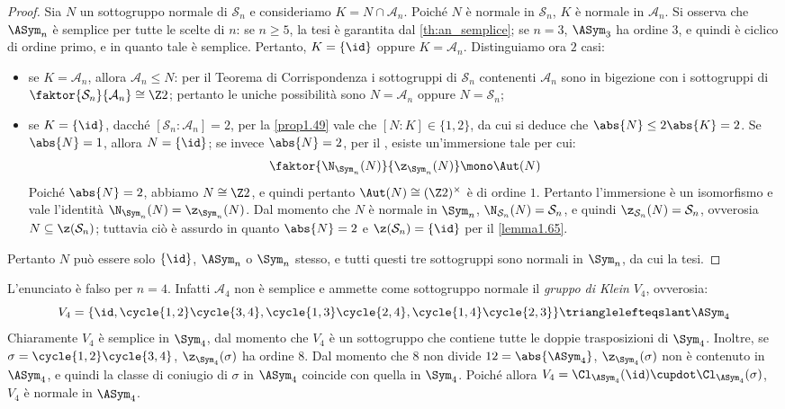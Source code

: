 \documentclass[11pt]{scrartcl}
\begin{document}
	\begin{proof}
		Sia $N$ un sottogruppo normale di $\mathcal{S}_n$ e consideriamo $K = N \cap \mathcal{A}_n$. Poiché $N$ è normale in $\mathcal{S}_n$, $K$ è normale
		in $\mathcal{A}_n$. Si osserva che $\ASym_n$ è semplice per tutte le scelte
		di $n$: se $n \geq 5$, la tesi è garantita dal \autoref{th:an_semplice}; se
		$n = 3$, $\ASym_3$ ha ordine
		$3$, e quindi è ciclico di ordine primo, e in quanto tale è semplice.
		Pertanto, $K = \{\id\}$ oppure $K = \mathcal{A}_n$. Distinguiamo ora $2$ casi:
		\begin{itemize}
			\item se $K = \mathcal{A}_n$, allora $\mathcal{A}_n \leqslant N$: per il
			Teorema di Corrispondenza i sottogruppi di $\mathcal{S}_n$ contenenti $\mathcal{A}_n$
			sono in bigezione con i sottogruppi di $\faktor{\mathcal{S}_n}{\mathcal{A}_n}\cong \Z2$;
			pertanto le uniche possibilità sono $N = \mathcal{A}_n$ oppure $N = \mathcal{S}_n$;
			\item se $K = \{\id\}$, dacché $[\mathcal{S}_n:\mathcal{A}_n] = 2$, per la 
			\autoref{prop1.49} vale che $[N : K] \in \{1, 2\}$, 
			da cui si deduce che $\abs{N} \leq 2 \abs{K} = 2$. Se $\abs{N} = 1$, allora $N = \{\id\}$; se invece $\abs{N} = 2$, per il , esiste
			un'immersione tale per cui:
			\[ \faktor{\N_{\Sym_n}(N)}{\z_{\Sym_n}(N)} \mono \Aut(N) \]
			Poiché $\abs{N} = 2$, abbiamo $N \cong \Z2$, e quindi pertanto $\Aut(N) \cong (\Z2)^\times$ è di ordine $1$. Pertanto l'immersione è un isomorfismo e
			vale l'identità
			$\N_{\Sym_n}(N) = \z_{\Sym_n}(N)$.
			Dal momento che $N$ è normale in $\Sym_n$, $\N_{\mathcal{S}_n}(N) = \mathcal{S}_n$,
			e quindi $\z_{\mathcal{S}_n}(N) = \mathcal{S}_n$, ovverosia $N \subseteq \z(\mathcal{S}_n)$; tuttavia ciò è assurdo
			in quanto $\abs{N} = 2$ e $\z(\mathcal{S}_n) = \{\id\}$ per il \autoref{lemma1.65}.
		\end{itemize}
		Pertanto $N$ può essere solo $\{\id\}$, $\ASym_n$ o $\Sym_n$ stesso, e tutti
		questi tre sottogruppi sono normali in $\Sym_n$, da cui la tesi.
	\end{proof}
	
	\begin{remark}
		L'enunciato è falso per $n = 4$.
		Infatti $\mathcal{A}_4$ non è semplice e ammette come sottogruppo normale il \textit{gruppo di Klein} $V_4$, ovverosia:
		\[
		V_4 = \{\id, \cycle{1, 2}\cycle{3, 4}, \cycle{1, 3}\cycle{2, 4}, \cycle{1, 4}\cycle{2, 3}\} \trianglelefteqslant \ASym_4
		\]
		Chiaramente $V_4$ è semplice in $\Sym_4$, dal momento che $V_4$ è un sottogruppo che contiene tutte le doppie
		trasposizioni di $\Sym_4$. Inoltre, se $\sigma = \cycle{1, 2}\cycle{3, 4}$, $\z_{\Sym_4}(\sigma)$ ha ordine $8$. Dal momento che $8$ non divide $12 = \abs{\ASym_4}$,
		$\z_{\Sym_4}(\sigma)$ non è contenuto in $\ASym_4$, e quindi la classe
		di coniugio di $\sigma$ in $\ASym_4$ coincide con quella in
		$\Sym_4$. Poiché allora $V_4 = \Cl_{\ASym_4}(\id) \cupdot \Cl_{\ASym_4}(\sigma)$,
		$V_4$ è normale in $\ASym_4$.
	\end{remark}
	
\end{document}
